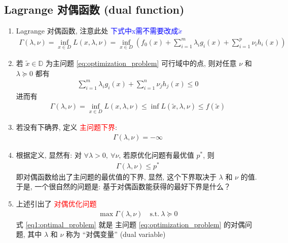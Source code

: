 \documentclass[oneside, 12pt]{ctexbook}
\begin{document}
			\subsection{\quad Lagrange 对偶函数 (dual function)}
				\begin{enumerate}
					\item Lagrange 对偶函数, 注意此处 \textcolor{blue}{下式中x需不需要改成$\widetilde{x}$}
						\begin{align}
							\Gamma (\lambda, \nu) = \inf \limits_{x \in D} L(x, \lambda, \nu) = \inf \limits_{x \in D} (f_0(x) + \sum_{i=1}^{m} \lambda_i g_i(x) + \sum_{i=1}^{p} \nu_i h_i(x))
						\end{align}
					
					\item 若 $\widetilde{x} \in \mathbb{D}$ 为主问题 \ref{eq:optimization_problem} 可行域中的点, 则对任意 $\nu$ 和 $\lambda \succeq 0$ 都有
						\begin{align}
							\sum_{i=1}^{m} \lambda_i g_i(x) + \sum_{i=1}^{n} \nu_j h_j(x) \leq 0
						\end{align}
						进而有
						\begin{align}
							\Gamma (\lambda, \nu) = \inf \limits_{x \in D} L(x, \lambda, \nu) \leq \inf L(\widetilde{x}, \lambda, \nu)
							\leq f(\widetilde{x})
						\end{align} 
					\item 若没有下确界, 定义 \textcolor{red}{主问题下界}:
						\begin{align}
							\Gamma (\lambda, \nu) = -\infty
						\end{align}
						
					\item 根据定义, 显然有: 对 $\forall \lambda > 0, \ \forall \nu$, 若原优化问题有最优值 $p^*$, 则
						\begin{align}
							\Gamma (\lambda, \nu) \leq p^*
						\end{align}
						即对偶函数给出了主问题的最优值的下界, 显然, 这个下界取决于 $\lambda$ 和 $\nu$ 的值. 于是, 一个很自然的问题是: 基于对偶函数能获得的最好下界是什么？
						
					\item 上述引出了 \textcolor{red}{对偶优化问题}
						\begin{align}
							\max \Gamma (\lambda, \nu) \quad \text{s.t.} \ \lambda \succeq 0 \label{eq1:optimal_problem}
						\end{align}
						式 \ref{eq1:optimal_problem} 就是 主问题 \ref{eq:optimization_problem} 的对偶问题, 其中 $\lambda$ 和 $\nu$ 称为 “对偶变量” (dual variable)
						

\end{enumerate}
\end{document}
